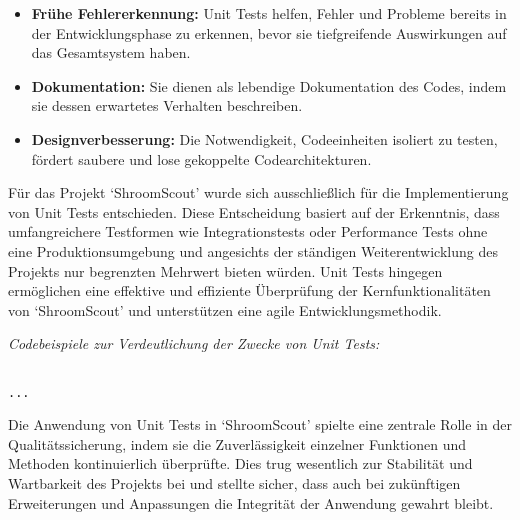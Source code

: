 \documentclass[../main.tex]{subfiles} %
\begin{document}
\begin{itemize}

	\item \textbf{Frühe Fehlererkennung:}
	      Unit Tests helfen, Fehler und Probleme bereits in der Entwicklungsphase zu erkennen, bevor sie tiefgreifende Auswirkungen auf das Gesamtsystem haben.

	\item \textbf{Dokumentation:}
	      Sie dienen als lebendige Dokumentation des Codes, indem sie dessen erwartetes Verhalten beschreiben.

	\item \textbf{Designverbesserung:}
	      Die Notwendigkeit, Codeeinheiten isoliert zu testen, fördert saubere und lose gekoppelte Codearchitekturen.

\end{itemize}

Für das Projekt `ShroomScout' wurde sich ausschließlich für die Implementierung von Unit Tests entschieden. Diese Entscheidung basiert auf der Erkenntnis,
dass umfangreichere Testformen wie Integrationstests oder Performance Tests ohne eine Produktionsumgebung und angesichts der ständigen Weiterentwicklung des
Projekts nur begrenzten Mehrwert bieten würden. Unit Tests hingegen er\-mög\-lich\-en eine effektive und effiziente Überprüfung der Kernfunktionalitäten von
`ShroomScout' und unterstützen eine agile Entwicklungsmethodik.

\textit{Codebeispiele zur Verdeutlichung der Zwecke von Unit Tests:}

\begin{verbatim}

...

\end{verbatim}

Die Anwendung von Unit Tests in `ShroomScout' spielte eine zentrale Rolle in der Qua\-li\-täts\-sich\-e\-rung, indem sie die Zuverlässigkeit einzelner
Funktionen und Methoden kontinuierlich überprüfte. Dies trug wesentlich zur Stabilität und Wartbarkeit des Projekts bei und stellte sicher, dass auch bei
zukünftigen Erweiterungen und Anpassungen die Integrität der Anwendung gewahrt bleibt.
\end{document}
